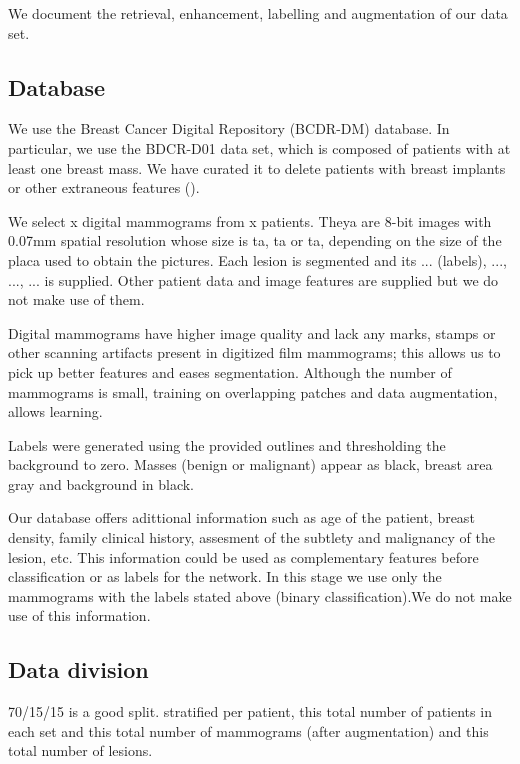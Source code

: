 We document the retrieval, enhancement, labelling and augmentation of our data set.

\subsection{Database}
We use the Breast Cancer Digital Repository (BCDR-DM) database. In particular, we use the BDCR-D01 data set, which is composed of patients with at least one breast mass. We have curated it to delete patients with breast implants or other extraneous features ().

We select x digital mammograms from x patients. Theya are 8-bit images with 0.07mm spatial resolution whose size is ta, ta or ta, depending on the size of the placa used to obtain the pictures. Each lesion is segmented and its ... (labels), ..., ..., ... is supplied. Other patient data and image features are supplied but we do not make use of them.

Digital mammograms have higher image quality and lack any marks, stamps or other scanning artifacts present in digitized film mammograms; this allows us to pick up better features and eases segmentation. Although the number of mammograms is small, training on overlapping patches and data augmentation, allows learning.

Labels were generated using the provided outlines and thresholding the background to zero. Masses (benign or malignant) appear as black, breast area gray and background in black.

Our database offers adittional information such as age of the patient, breast density, family clinical history, assesment of the subtlety and malignancy of the lesion, etc. This information could be used as complementary features before classification or as labels for the network. In this stage we use only the mammograms with the labels stated above (binary classification).We do not make use of this information.


\subsection{Data division}
70/15/15 is a good split. stratified per patient, this total number of patients in each set and this total number of mammograms (after augmentation) and this total number of lesions.

